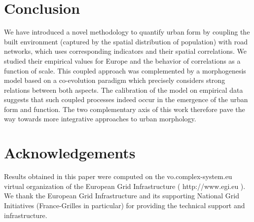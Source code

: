 \section*{Conclusion}


We have introduced a novel methodology to quantify urban form by coupling the built environment (captured by the spatial distribution of population) with road networks, which uses corresponding indicators and their spatial correlations. We studied their empirical values for Europe and the behavior of correlations as a function of scale. This coupled approach was complemented by a morphogenesis model based on a co-evolution paradigm which precisely considers strong relations between both aspects. The calibration of the model on empirical data suggests that such coupled processes indeed occur in the emergence of the urban form and function. The two complementary axis of this work therefore pave the way towards more integrative approaches to urban morphology.


\section*{Acknowledgements}

Results obtained in this paper were computed on the vo.complex-system.eu virtual organization of the European Grid Infrastructure ( http://www.egi.eu ). We thank the European Grid Infrastructure and its supporting National Grid Initiatives (France-Grilles in particular) for providing the technical support and infrastructure.






\footnotesize

\begin{multicols}{2}


\end{multicols}






